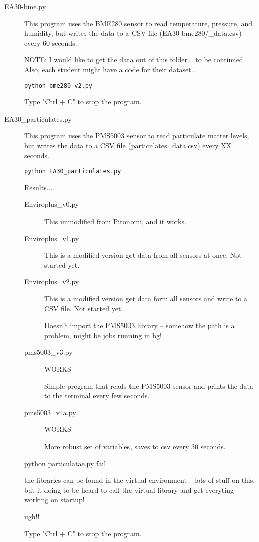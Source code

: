 \documentclass{article}
\begin{document}
\begin{description}
  \item[EA30-bme.py] This program uses the BME280 sensor to read temperature, pressure, and humidity, but writes the data to a CSV file (EA30-bme280/_data.csv) every 60 seconds. 
  
NOTE: I would like to get the data out of this folder... to be continued. Also, each student might have a code for their dataset...
  
  \begin{verbatim}
python bme280_v2.py
  \end{verbatim} 

Type "Ctrl + C" to stop the program.
  
  
\item[EA30\_particulates.py] This program uses the PMS5003 sensor to read particulate matter levels, but writes the data to a CSV file (particulates\_data.csv) every XX seconds.


\begin{verbatim}
python EA30_particulates.py
\end{verbatim}


Results...
\begin{description}
  \item[Enviroplus\_v0.py] This unmodified from Pironomi, and it works. 
  \item[Enviroplus\_v1.py] This is a modified version get data from all sensors at once. Not started yet.   \item[Enviroplus\_v2.py] This is a modified version get data form all sensors and write to a CSV file. Not started yet.
  
    
Doesn't import the PMS5003 library -- somehow the path is a problem, might be jobs running in bg!

\item[pms5003_v3.py] WORKS

Simple program that reads the PMS5003 sensor and prints the data to the terminal every few seconds.

\item[pms5003_v4a.py] WORKS

More robust set of variables, saves to csv every 30 seconds.


\end{description}





python particulatae.py fail

the libraries can be found in the virtual environment -- lots of stuff on this, but it doing to be heard to call the virtual library and get everyting working on startup!

ugh!!


Type "Ctrl + C" to stop the program.

\end{description}
\end{document}
